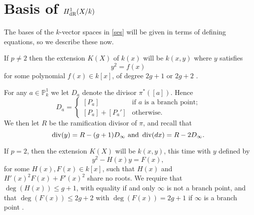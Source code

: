\begin{comment}
In order to do this we will need to use Serre duality, which we briefly remind the reader of presently.
Serre duality states that $H^0(X,\Omega_X)$ and $H^1(X,\cO_X)$ are dual to each other, and that there is a canonical map ${\text Res}:H^0(X,\omega_X) \times H^1(X,\cO_X) \rightarrow k$.
Details of the definition of ${\text Res}$ can be found in appendix B of \todo{in progress}
\todo[inline]{add details - in particular, relate to the basis we have for de rham}
\end{comment}
\section{Basis of $H_{\text {dR}}^1(X/k)$}

The bases of the $k$-vector spaces in \eqref{ses} will be given in terms of defining equations, so we describe these now.

If $p \neq 2$ then the extension $K(X)$ of $k(x)$ will be $k(x,y)$ where $y$ satisfies
\begin{equation}\label{definingequationpnot2}
y^2 = f(x)
\end{equation}
for some polynomial $f(x) \in k[x]$, of degree $2g+1$ or $2g+2$ \cite[Prop 7.4.24]{liu}.

For any $a\in \mathbb P_k^1$ we let $D_a$ denote the divisor $\pi^*([a])$.
Hence 
\begin{equation}\label{divisorofpoints}
D_a= 
\begin{cases}
 [P_a] & \text{if $a$ is a branch point;} \\
 [P_a] + [P_a'] & \text{otherwise.}
\end{cases}
\end{equation}
We then let $R$ be the ramification divisor of $\pi$, and recall that 
\begin{equation}\label{pnot2divisors}
\operatorname{div}(y)  = R - (g+1)D_\infty \text{ and } \operatorname{div}( dx) = R - 2D_\infty.
\end{equation}


If $p=2$, then the extension $K(X)$ will be $k(x,y)$, this time with $y$ defined by
\begin{equation}\label{definep=2}
y^2 - H(x)y = F(x),
\end{equation}
for some $H(x),F(x) \in k[x]$, such that $H(x)$ and $H'(x)^2F(x) + F'(x)^2$ share no roots.
We require that $\deg(H(x)) \leq g+1$, with equality if and only $\infty$ is not a branch point, and that $\deg(F(x)) \leq 2g+2$ with $\deg(F(x)) = 2g+1$ if $\infty$ is a branch point  \cite[Prop 7.4.24]{liu}.



